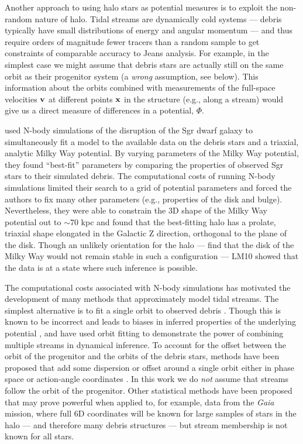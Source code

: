 \documentclass[letterpaper,12pt,preprint]{aastex}
\newcommand{\project}[1]{\textsl{#1}}
\newcommand{\gaia}{\project{Gaia}}
\begin{document}
Another approach to using halo stars as potential measures is to exploit the non-random nature of halo. Tidal streams are dynamically cold systems --- debris typically have small distributions of energy and angular momentum --- and thus require orders of magnitude fewer tracers than a random sample to get constraints of comparable accuracy to Jeans analysis. For example, in the simplest case we might assume that debris stars are actually still on the same orbit as their progenitor system (a \emph{wrong} assumption, see below). This information about the orbits combined with measurements of the full-space velocities ${\bf v}$ at different points ${\bf x}$ in the structure (e.g., along a stream) would give us a direct measure of differences in a potential, $\Phi$.

\citet[][LM10]{law10} used N-body simulations of the disruption of the Sgr dwarf galaxy to simultaneously fit a model to the available data on the debris stars and a triaxial, analytic Milky Way potential. By varying parameters of the Milky Way potential, they found ``best-fit'' parameters by comparing the properties of observed Sgr stars to their simulated debris. The computational costs of running N-body simulations limited their search to a grid of potential parameters and forced the authors to fix many other parameters (e.g., properties of the disk and bulge). Nevertheless, they were able to constrain the 3D shape of the Milky Way potential out to $\sim$70 kpc and found that the best-fitting halo has a prolate, triaxial shape elongated in the Galactic Z direction, orthogonal to the plane of the disk. Though an unlikely orientation for the halo --- \cite{debattista13} find that the disk of the Milky Way would not remain stable in such a configuration --- LM10 showed that the data is at a state where such inference is possible. 

The computational costs associated with N-body simulations has motivated the development of many methods that approximately model tidal streams. The simplest alternative is to fit a single orbit to observed debris \citep[e.g.,][]{koposov10, deg13}. Though this is known to be incorrect and leads to biases in inferred properties of the underlying potential \citep[e.g.,][]{eyre11, lux13, sanders13a}, \cite{deg14} and \cite{lux13} have used orbit fitting to demonstrate the power of combining multiple streams in dynamical inference. To account for the offset between the orbit of the progenitor and the orbits of the debris stars, methods have been proposed that add some dispersion or offset around a single orbit either in phase space \citep[e.g.,][]{eyre09a, varghese11, kuepper12} or action-angle coordinates \citep{eyre11, sanders13b, bovy14, sanders14}. In this work we do \emph{not} assume that streams follow the orbit of the progenitor. Other statistical methods have been proposed \citep[][]{penarrubia12, johnston99a} that may prove powerful when applied to, for example, data from the \gaia\, mission, where full 6D coordinates will be known for large samples of stars in the halo --- and therefore many debris structures --- but stream membership is not known for all stars. %
\end{document}
